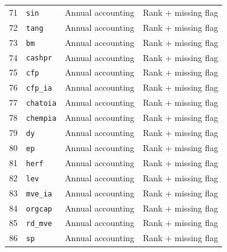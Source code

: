 {\begin{longtable}{@{}rlll@{}}
71 & \texttt{sin} & Annual accounting & Rank + missing flag\\
72 & \texttt{tang} & Annual accounting & Rank + missing flag\\
73 & \texttt{bm} & Annual accounting & Rank + missing flag\\
74 & \texttt{cashpr} & Annual accounting & Rank + missing flag\\
75 & \texttt{cfp} & Annual accounting & Rank + missing flag\\
76 & \texttt{cfp\_ia} & Annual accounting & Rank + missing flag\\
77 & \texttt{chatoia} & Annual accounting & Rank + missing flag\\
78 & \texttt{chempia} & Annual accounting & Rank + missing flag\\
79 & \texttt{dy} & Annual accounting & Rank + missing flag\\
80 & \texttt{ep} & Annual accounting & Rank + missing flag\\
81 & \texttt{herf} & Annual accounting & Rank + missing flag\\
82 & \texttt{lev} & Annual accounting & Rank + missing flag\\
83 & \texttt{mve\_ia} & Annual accounting & Rank + missing flag\\
84 & \texttt{orgcap} & Annual accounting & Rank + missing flag\\
85 & \texttt{rd\_mve} & Annual accounting & Rank + missing flag\\
86 & \texttt{sp} & Annual accounting & Rank + missing flag\\
\end{longtable}
}
